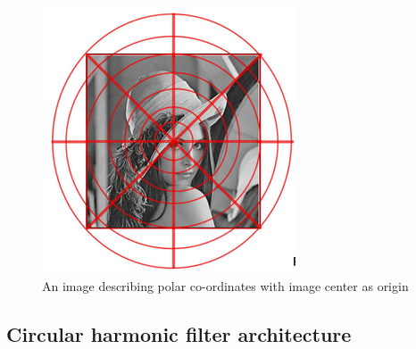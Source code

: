 \documentclass{article}
\begin{document}
\begin{figure}[t!]
  \includegraphics[width=\linewidth]{PolarImage.png}
  \caption{An image describing polar co-ordinates with image center as origin}
  \label{fig:polarCoord}
\end{figure}



\subsection{Circular harmonic filter architecture}
\end{document}
